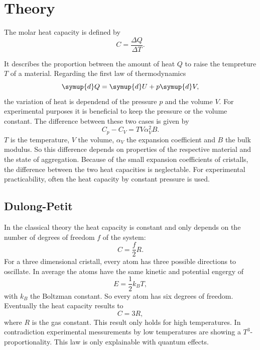 \section{Theory}
\label{sec:Theorie}

The molar heat capacity is defined by 
\begin{equation}
    C = \frac{\Delta Q}{\Delta T}.
\end{equation}

It describes the proportion between the amount of heat $Q$ to raise the tempreture $T$ of a material. 
Regarding the first law of thermodynamics
\begin{equation}
    \symup{d}Q = \symup{d}U+p\symup{d}V,
\end{equation}
the variation of heat is dependend of the pressure $p$ and the volume $V$.
For experimental purposes it is beneficial to keep the pressure or the volume constant.
The difference between these two cases is given by
\begin{equation}
    C_p - C_V = T V \alpha_V^2 B.
\end{equation}
$T$ is the temperature, $V$ the volume, $\alpha_V$ the expansion coefficient and $B$ the bulk modulus.
So this difference depends on properties of the respective material and the state of aggregation. 
Because of the small expansion coefficients of cristalls, the difference between the two heat capacities is neglectable.
For experimental practicability, often the heat capacity by constant pressure is used.


\subsection{Dulong-Petit}
In the classical theory the heat capacity is constant and only depends on the number of degrees of freedom $f$ of the system:
\begin{equation}
    C = \frac{f}{2} R.
\end{equation} 
For a three dimensional cristall, every atom has three possible directions to oscillate. 
In average the atoms have the same kinetic and potential engergy of 
\begin{equation}
    E = \frac{1}{2}k_B T,
\end{equation}
with $k_B$ the Boltzman constant.
So every atom has six degrees of freedom. 
Eventually the heat capacity results to
\begin{equation}
    C = 3 R,
\end{equation}
where $R$ is the gas constant.
This result only holds for high temperatures. 
In contradiction experimental messurements by low temperatures are showing a $T^3$-proportionality.
This law is only explainable with quantum effects.

